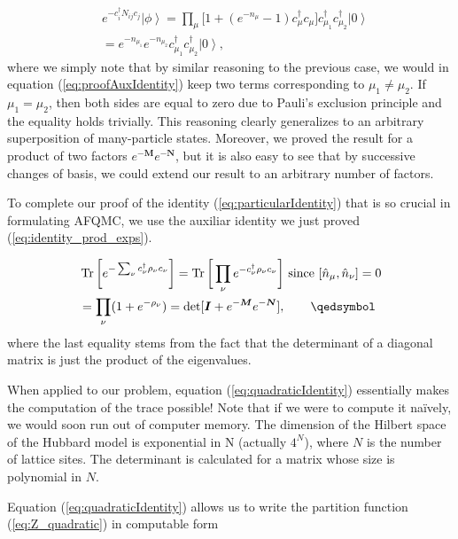 \begin{equation}
\begin{split}
&e^{-c_i^\dagger N_{ij} c_j} \left| \phi \right\rangle = \prod_\mu \bigg[ 1 + (e^{-n_\mu} -1 ) c_\mu^\dagger c_\mu \bigg] c_{\mu_1}^\dagger c_{\mu_2}^\dagger \left| 0 \right\rangle \\
&= e^{-n_{\mu_1}} e^{-n_{\mu_2}} c_{\mu_1}^\dagger c_{\mu_2}^\dagger \left| 0 \right\rangle ,
\end{split}
\end{equation}
where we simply note that by similar reasoning to the previous case, we would in equation (\ref{eq:proofAuxIdentity}) keep two terms corresponding to $\mu_1 \neq \mu_2$. If $\mu_1 = \mu_2$, then both sides are equal to zero due to Pauli's exclusion principle and the equality holds trivially. This reasoning clearly generalizes to an arbitrary superposition of many-particle states. Moreover, we proved the result for a product of two factors $e^{-\bm M} e^{-\bm N}$, but it is also easy to see that by successive changes of basis, we could extend our result to an arbitrary number of factors.

To complete our proof of the identity (\ref{eq:particularIdentity}) that is so crucial in formulating AFQMC, we use the auxiliar identity we just proved (\ref{eq:identity_prod_exps}).

\begin{equation}\label{eq:completeProof}
\begin{split}
&\Tr \bigg[ e^{-\sum_\nu c_\nu^\dagger \rho_\nu c_\nu} \bigg] = \Tr \bigg[ \prod_\nu e^{-c_\nu^\dagger \rho_\nu c_\nu } \bigg] \text{  since  } [\hat{n}_\mu, \hat{n}_\nu] = 0 \\
&= \prod_\nu ( 1 + e^{-\rho_\nu} ) = \text{det} [ \bm I + e^{-\bm M} e^{-\bm N} ], \quad\quad \qedsymbol
\end{split}
\end{equation}
where the last equality stems from the fact that the determinant of a diagonal matrix is just the product of the eigenvalues.

When applied to our problem, equation (\ref{eq:quadraticIdentity}) essentially makes the computation of the trace possible! Note that if we were to compute it na\"ively, we would soon run out of computer memory. The dimension of the Hilbert space of the Hubbard model is exponential in N (actually $4^N$), where $N$ is the number of lattice sites. The determinant is calculated for a matrix whose size is polynomial in $N$. 

Equation (\ref{eq:quadraticIdentity}) allows us to write the partition function (\ref{eq:Z_quadratic}) in computable form

